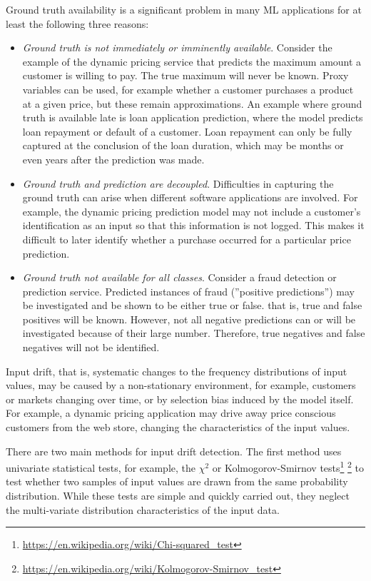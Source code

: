 Ground truth availability is a significant problem in many ML applications for at least the following three reasons:

\begin{itemize}
   \item \emph{Ground truth is not immediately or imminently available}. Consider the example of the dynamic pricing service that predicts the maximum amount a customer is willing to pay. The true maximum will never be known. Proxy variables can be used, for example whether a customer purchases a product at a given price, but these remain approximations. An example where ground truth is available late is loan application prediction, where the model predicts loan repayment or default of a customer. Loan repayment can only be fully captured at the conclusion of the loan duration, which may be months or even years after the prediction was made.
   \item \emph{Ground truth and prediction are decoupled}. Difficulties in capturing the ground truth can arise when different software applications are involved. For example, the dynamic pricing prediction model may not include a customer's identification as an input so that this information is not logged. This makes it difficult to later identify whether a purchase occurred for a particular price prediction.
   \item \emph{Ground truth not available for all classes}. Consider a fraud detection or prediction service. Predicted instances of fraud (''positive predictions'') may be investigated and be shown to be either true or false. that is, true and false positives will be known. However, not all negative predictions can or will be investigated because of their large number. Therefore, true negatives and false negatives will not be identified.
\end{itemize}

Input drift, that is, systematic changes to the frequency distributions of input values, may be caused by a non-stationary environment, for example, customers or markets changing over time, or by selection bias induced by the model itself. For example, a dynamic pricing application may drive away price conscious customers from the web store, changing the characteristics of the input values.

There are two main methods for input drift detection. The first method uses univariate statistical tests, for example, the  $\chi^2$ or Kolmogorov-Smirnov tests\footnote{\url{https://en.wikipedia.org/wiki/Chi-squared_test}} \footnote{\url{https://en.wikipedia.org/wiki/Kolmogorov-Smirnov_test}} to test whether two samples of input values are drawn from the same probability distribution. While these tests are simple and quickly carried out, they neglect the multi-variate distribution characteristics of the input data. 

